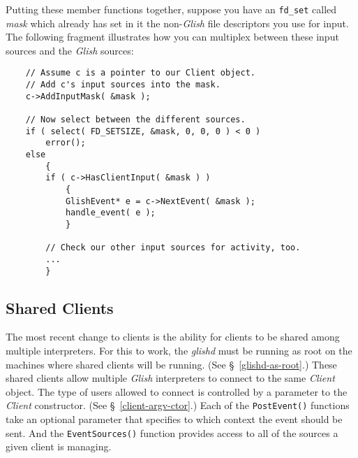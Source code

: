 Putting these member functions together, suppose you have an {\tt fd\_set}
called {\em mask} which already has set in it the non-{\em Glish} file descriptors
you use for input.  The following fragment illustrates how you can
multiplex between these input sources and the {\em Glish} sources:
\begin{verbatim}
    // Assume c is a pointer to our Client object.
    // Add c's input sources into the mask.
    c->AddInputMask( &mask );

    // Now select between the different sources.
    if ( select( FD_SETSIZE, &mask, 0, 0, 0 ) < 0 )
        error();
    else
        {
        if ( c->HasClientInput( &mask ) )
            {
            GlishEvent* e = c->NextEvent( &mask );
            handle_event( e );
            }

        // Check our other input sources for activity, too.
        ...
        }
\end{verbatim}

\subsection{Shared Clients}
\label{shared-clients-lib}

The most recent change to clients is the ability for clients to be shared
among multiple interpreters. For this to work, the {\em glishd} must be
running as root on the machines where shared clients will be running.
(See \S~\ref{glishd-as-root}.) These shared clients allow multiple
{\em Glish}
interpreters to connect to the same {\em Client} object. The type of
users allowed to connect is controlled by a parameter to the {\em Client}
constructor.  (See \S~\ref{client-argv-ctor}.)  Each of the {\tt PostEvent()}
functions take an optional parameter that specifies to which context the
event should be sent. And the {\tt EventSources()} function provides access
to all of the sources a given client is managing.

